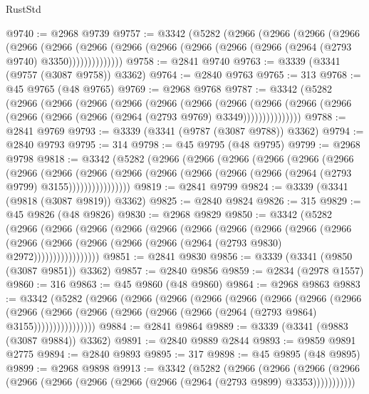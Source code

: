 \begin{lexlean}{RustStd}
\begin{coremodule}
@9740 := @2968 @9739
@9757 := @3342
    (@5282
      (@2966
        (@2966
          (@2966
            (@2966
              (@2966
                (@2966
                  (@2966 (@2966 (@2966 (@2966 (@2966 (@2966 (@2964 (@2793 @9740) @3350))))))))))))))
@9758 := @2841 @9740
@9763 := @3339 (@3341 (@9757 (@3087 @9758)) @3362)
@9764 := @2840 @9763
@9765 := 313
@9768 := @45 @9765 (@48 @9765)
@9769 := @2968 @9768
@9787 := @3342
    (@5282
      (@2966
        (@2966
          (@2966
            (@2966
              (@2966
                (@2966
                  (@2966
                    (@2966
                      (@2966 (@2966 (@2966 (@2966 (@2966 (@2964 (@2793 @9769) @3349)))))))))))))))
@9788 := @2841 @9769
@9793 := @3339 (@3341 (@9787 (@3087 @9788)) @3362)
@9794 := @2840 @9793
@9795 := 314
@9798 := @45 @9795 (@48 @9795)
@9799 := @2968 @9798
@9818 := @3342
    (@5282
      (@2966
        (@2966
          (@2966
            (@2966
              (@2966
                (@2966
                  (@2966
                    (@2966
                      (@2966
                        (@2966
                          (@2966 (@2966 (@2966 (@2966 (@2964 (@2793 @9799) @3155))))))))))))))))
@9819 := @2841 @9799
@9824 := @3339 (@3341 (@9818 (@3087 @9819)) @3362)
@9825 := @2840 @9824
@9826 := 315
@9829 := @45 @9826 (@48 @9826)
@9830 := @2968 @9829
@9850 := @3342
    (@5282
      (@2966
        (@2966
          (@2966
            (@2966
              (@2966
                (@2966
                  (@2966
                    (@2966
                      (@2966
                        (@2966
                          (@2966
                            (@2966 (@2966 (@2966 (@2966 (@2964 (@2793 @9830) @2972)))))))))))))))))
@9851 := @2841 @9830
@9856 := @3339 (@3341 (@9850 (@3087 @9851)) @3362)
@9857 := @2840 @9856
@9859 := @2834 (@2978 @1557)
@9860 := 316
@9863 := @45 @9860 (@48 @9860)
@9864 := @2968 @9863
@9883 := @3342
    (@5282
      (@2966
        (@2966
          (@2966
            (@2966
              (@2966
                (@2966
                  (@2966
                    (@2966
                      (@2966
                        (@2966
                          (@2966 (@2966 (@2966 (@2966 (@2964 (@2793 @9864) @3155))))))))))))))))
@9884 := @2841 @9864
@9889 := @3339 (@3341 (@9883 (@3087 @9884)) @3362)
@9891 := @2840 @9889 @2844
@9893 := @9859 @9891 @2775
@9894 := @2840 @9893
@9895 := 317
@9898 := @45 @9895 (@48 @9895)
@9899 := @2968 @9898
@9913 := @3342
    (@5282
      (@2966
        (@2966
          (@2966 (@2966 (@2966 (@2966 (@2966 (@2966 (@2966 (@2964 (@2793 @9899) @3353)))))))))))

\end{coremodule}
\end{lexlean}
